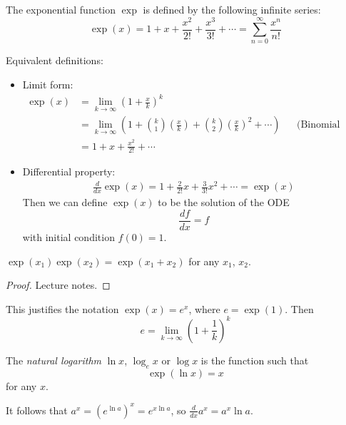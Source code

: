 \documentclass{../template/note}
\begin{document}
    \begin{definition}
        The exponential function \(\exp\) is defined by the following infinite series:
        \[
            \exp(x) = 1 + x + \frac{x^2}{2!} + \frac{x^3}{3!} + \cdots = \sum_{n=0}^\infty \frac{x^n}{n!}
        \]
    \end{definition}
    
    Equivalent definitions:
    \begin{itemize}
        \item Limit form:
        \begin{align*}
            \exp(x) &= \lim_{k \to \infty} \left(1 + \frac x k\right)^k \\
            &= \lim_{k \to \infty} \left(1 + \binom{k}{1} \left(\frac x k\right) + \binom{k}{2}\left(\frac x k\right)^2 + \cdots\right) && \text{(Binomial thm)} \\
            &= 1 + x + \frac{x^2}{2!} + \cdots
        \end{align*}
        \item Differential property:
        \begin{align*}
            \frac{d}{dx} \exp(x) = 1 + \frac{2}{2!} x + \frac{3}{3!} x^2 + \cdots = \exp(x)
        \end{align*}
        Then we can define \(\exp(x)\) to be the solution of the ODE
        \[
            \frac{df}{dx} = f
        \]
        with initial condition \(f(0) = 1\).
    \end{itemize}

    \begin{proposition}
        \(\exp(x_1)\exp(x_2) = \exp(x_1+x_2)\) for any \(x_1\), \(x_2\).
    \end{proposition}
    
    \begin{proof}
        Lecture notes.
    \end{proof}

    \begin{remark*}
        This justifies the notation \(\exp(x) = e^x\), where \(e = \exp(1)\). Then
        \[
            e = \lim_{k \to \infty} \left(1 + \frac 1 k\right)^k
        \]
    \end{remark*}
    
    
    \begin{definition}
        The \emph{natural logarithm} \(\ln x\), \(\log_e x\) or \(\log x\) is the function such that
        \[
            \exp(\ln x) = x
        \]
        for any \(x\).
    \end{definition}
    It follows that \(a^x = \left(e^{\ln a}\right)^x = e^{x \ln a}\), so \(\frac{d}{dx} a^x = a^x \ln a\).
    
\end{document}
